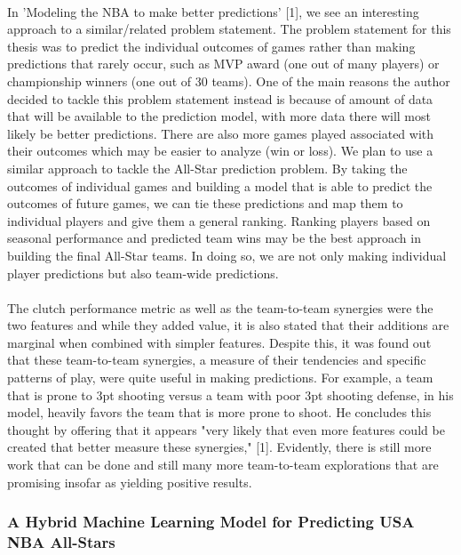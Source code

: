 \documentclass{article}
\begin{document}
\paragraph{}
In 'Modeling the NBA to make better predictions' [1], we see an interesting approach to a similar/related problem statement. The problem statement for this thesis was to predict the individual outcomes of games rather than making predictions that rarely occur, such as MVP award (one out of many players) or championship winners (one out of 30 teams). One of the main reasons the author decided to tackle this problem statement instead is because of amount of data that will be available to the prediction model, with more data there will most likely be better predictions. There are also more games played associated with their outcomes which may be easier to analyze (win or loss). We plan to use a similar approach to tackle the All-Star prediction problem. By taking the outcomes of individual games and building a model that is able to predict the outcomes of future games, we can tie these predictions and map them to individual players and give them a general ranking. Ranking players based on seasonal performance and predicted team wins may be the best approach in building the final All-Star teams. In doing so, we are not only making individual player predictions but also team-wide predictions.
\paragraph{}
The clutch performance metric as well as the team-to-team synergies were the two features and while they added value, it is also stated that their additions are marginal when combined with simpler features. Despite this, it was found out that these team-to-team synergies, a measure of their tendencies and specific patterns of play, were quite useful in making predictions. For example, a team that is prone to 3pt shooting versus a team with poor 3pt shooting defense, in his model, heavily favors the team that is more prone to shoot. He concludes this thought by offering that it appears "very likely that even more features could be created that better measure these synergies," [1]. Evidently, there is still more work that can be done and still many more team-to-team explorations that are promising insofar as yielding positive results.


\subsubsection*{A Hybrid Machine Learning Model for Predicting USA NBA All-Stars}
\end{document}
